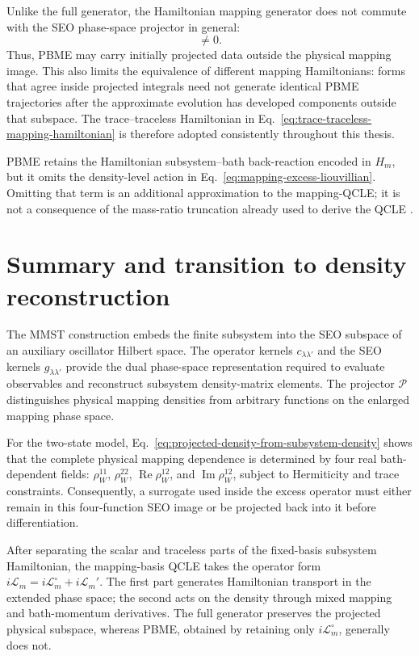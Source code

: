\documentclass[
  11pt,
  letterpaper,
  onehalfspacing,
  normalmargins,
  equalmargins,
  oneside
]{ut-thesis}
\begin{document}
Unlike the full generator, the Hamiltonian mapping generator does not commute
with the SEO phase-space projector in general:
\begin{equation}
[\mathcal P,i\mathcal L_m^{\circ}]\neq0.
\label{eq:pbme-projector-noncommutation}
\end{equation}
Thus, PBME may carry initially projected data outside the physical mapping
image. This also limits the equivalence of different mapping Hamiltonians:
forms that agree inside projected integrals need not generate identical PBME
trajectories after the approximate evolution has developed components outside
that subspace. The trace--traceless Hamiltonian in
Eq.~\eqref{eq:trace-traceless-mapping-hamiltonian} is therefore adopted
consistently throughout this thesis.

PBME retains the Hamiltonian subsystem--bath back-reaction encoded in
\(H_m\), but it omits the density-level action in
Eq.~\eqref{eq:mapping-excess-liouvillian}. Omitting that term is an additional
approximation to the mapping-QCLE; it is not a consequence of the
mass-ratio truncation already used to derive the QCLE
\cite{NassimiBonellaKapral2010,Kelly2012JCP}.


\section{Summary and transition to density reconstruction}
\label{sec:summary-transition-density-level}

The MMST construction embeds the finite subsystem into the SEO subspace of an
auxiliary oscillator Hilbert space. The operator kernels
\(c_{\lambda\lambda'}\) and the SEO kernels
\(g_{\lambda\lambda'}\) provide the dual phase-space representation required
to evaluate observables and reconstruct subsystem density-matrix elements.
The projector \(\mathcal P\) distinguishes physical mapping densities from
arbitrary functions on the enlarged mapping phase space.

For the two-state model,
Eq.~\eqref{eq:projected-density-from-subsystem-density} shows that the
complete physical mapping dependence is determined by four real
bath-dependent fields:
\(\rho_W^{11}\), \(\rho_W^{22}\),
\(\operatorname{Re}\rho_W^{12}\), and
\(\operatorname{Im}\rho_W^{12}\), subject to Hermiticity and trace
constraints. Consequently, a surrogate used inside the excess operator must
either remain in this four-function SEO image or be projected back into it
before differentiation.

After separating the scalar and traceless parts of the fixed-basis subsystem
Hamiltonian, the mapping-basis QCLE takes the operator form
\(i\mathcal L_m=i\mathcal L_m^{\circ}+i\mathcal L_m'\). The first part
generates Hamiltonian transport in the extended phase space; the second acts
on the density through mixed mapping and bath-momentum derivatives. The full
generator preserves the projected physical subspace, whereas PBME, obtained by
retaining only \(i\mathcal L_m^{\circ}\), generally does not.
\end{document}
